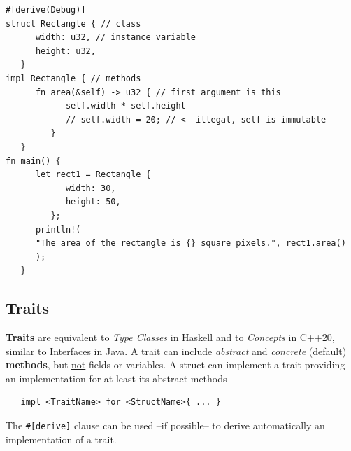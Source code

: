 \begin{lstlisting}
#[derive(Debug)]
struct Rectangle { // class
      width: u32, // instance variable
      height: u32,
   }
impl Rectangle { // methods
      fn area(&self) -> u32 { // first argument is this
            self.width * self.height
            // self.width = 20; // <- illegal, self is immutable
         }
   }
fn main() {
      let rect1 = Rectangle {
            width: 30,
            height: 50,
         };
      println!(
      "The area of the rectangle is {} square pixels.", rect1.area()
      );
   }
\end{lstlisting}

\subsection{Traits}
\textbf{Traits} are equivalent to \textit{Type Classes} in Haskell and to \textit{Concepts} in
C++20, similar to Interfaces in Java.
A trait can include \textit{abstract} and \textit{concrete} (default)
\textbf{methods}, but \underline{not} fields or variables.
A struct can implement a trait providing an
implementation for at least its abstract methods
\begin{lstlisting}
   impl <TraitName> for <StructName>{ ... }
\end{lstlisting}

The \lstinline|#[derive]| clause can be used {--}if possible{--} to derive
automatically an implementation of a trait.
\nl

